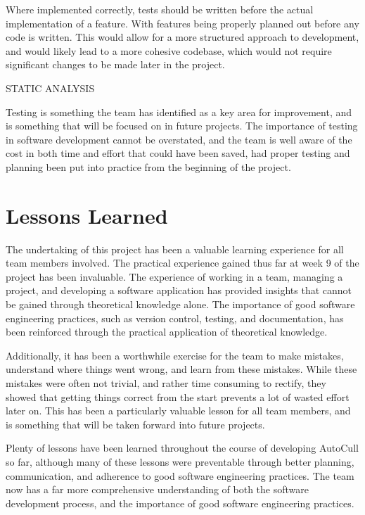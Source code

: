 \documentclass[conference]{IEEEtran}
\begin{document}
Where implemented correctly, tests should be written before the actual implementation of a feature. With features being properly planned out before any code is written. This would allow for a more structured approach to development, and would likely lead to a more cohesive codebase, which would not require significant changes to be made later in the project.

STATIC ANALYSIS

Testing is something the team has identified as a key area for improvement, and is something that will be focused on in future projects. The importance of testing in software development cannot be overstated, and the team is well aware of the cost in both time and effort that could have been saved, had proper testing and planning been put into practice from the beginning of the project.

\section{Lessons Learned}
The undertaking of this project has been a valuable learning experience for all team members involved. The practical experience gained thus far at week 9 of the project has been invaluable. The experience of working in a team, managing a project, and developing a software application has provided insights that cannot be gained through theoretical knowledge alone. The importance of good software engineering practices, such as version control, testing, and documentation, has been reinforced through the practical application of theoretical knowledge. 

Additionally, it has been a worthwhile exercise for the team to make mistakes, understand where things went wrong, and learn from these mistakes. While these mistakes were often not trivial, and rather time consuming to rectify, they showed that getting things correct from the start prevents a lot of wasted effort later on. This has been a particularly valuable lesson for all team members, and is something that will be taken forward into future projects.

Plenty of lessons have been learned throughout the course of developing AutoCull so far, although many of these lessons were preventable through better planning, communication, and adherence to good software engineering practices. The team now has a far more comprehensive understanding of both the software development process, and the importance of good software engineering practices. 
\end{document}
